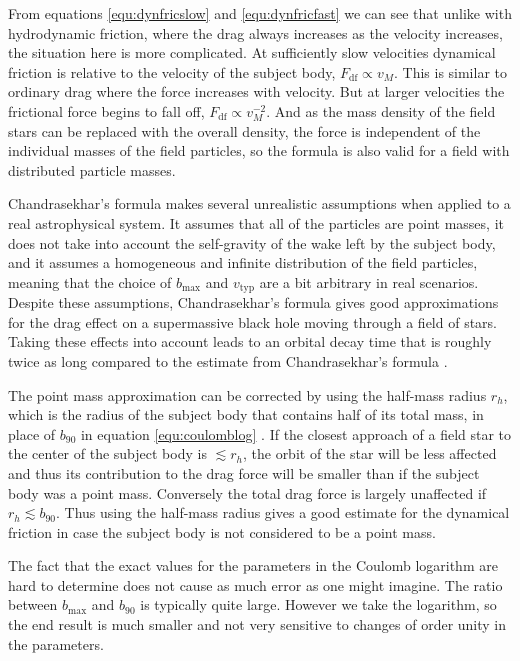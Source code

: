 \documentclass[english, oneside]{HYgradu}
\begin{document}
From equations \eqref{equ:dynfricslow} and \eqref{equ:dynfricfast} we can see that unlike with hydrodynamic friction, where the drag always increases as the velocity increases, the situation here is more complicated. At sufficiently slow velocities dynamical friction is relative to the velocity of the subject body, $F_{\mathrm{df}} \propto v_M$. This is similar to ordinary drag where the force increases with velocity. But at larger velocities the frictional force begins to fall off, $F_{\mathrm{df}} \propto v_M^{-2}$. And as the mass density of the field stars can be replaced with the overall density, the force is independent of the individual masses of the field particles, so the formula is also valid for a field with distributed particle masses.

Chandrasekhar's formula makes several unrealistic assumptions when applied to a real astrophysical system. It assumes that all of the particles are point masses, it does not take into account the self-gravity of the wake left by the subject body, and it assumes a homogeneous and infinite distribution of the field particles, meaning that the choice of $b_\mathrm{max}$ and $v_\mathrm{typ}$ are a bit arbitrary in real scenarios. Despite these assumptions, Chandrasekhar's formula gives good approximations for the drag effect on a supermassive black hole moving through a field of stars. Taking these effects into account leads to an orbital decay time that is roughly twice as long compared to the estimate from Chandrasekhar's formula \citep{weinberg:1989}.

The point mass approximation can be corrected by using the half-mass radius $r_h$, which is the radius of the subject body that contains half of its total mass, in place of $b_{90}$ in equation \eqref{equ:coulomblog} \citep{bt-galdyn}. If the closest approach of a field star to the center of the subject body is $\lesssim r_h$, the orbit of the star will be less affected and thus its contribution to the drag force will be smaller than if the subject body was a point mass. Conversely the total drag force is largely unaffected if $r_h \lesssim b_{90}$. Thus using the half-mass radius gives a good estimate for the dynamical friction in case the subject body is not considered to be a point mass.

The fact that the exact values for the parameters in the Coulomb logarithm are hard to determine does not cause as much error as one might imagine. The ratio between $b_\mathrm{max}$ and $b_{90}$ is typically quite large. However we take the logarithm, so the end result is much smaller and not very sensitive to changes of order unity in the parameters. 
\end{document}
